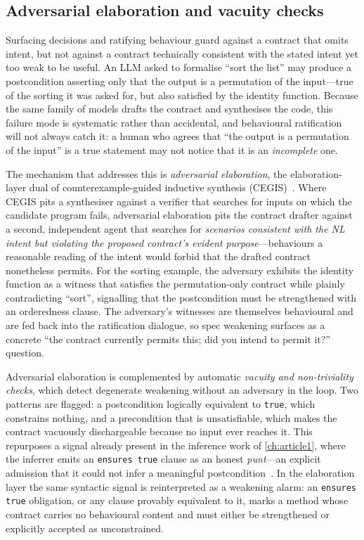 \subsection{Adversarial elaboration and vacuity checks}\label{subsec:a5-adversarial}

Surfacing decisions and ratifying behaviour guard against a contract that omits intent, but not against a contract technically consistent with the stated intent yet too weak to be useful. An LLM asked to formalise ``sort the list'' may produce a postcondition asserting only that the output is a permutation of the input---true of the sorting it was asked for, but also satisfied by the identity function. Because the same family of models drafts the contract and synthesises the code, this failure mode is systematic rather than accidental, and behavioural ratification will not always catch it: a human who agrees that ``the output is a permutation of the input'' is a true statement may not notice that it is an \emph{incomplete} one.

The mechanism that addresses this is \emph{adversarial elaboration}, the elaboration-layer dual of counterexample-guided inductive synthesis (CEGIS)~\cite{solarlezama2008sketching}. Where CEGIS pits a synthesiser against a verifier that searches for inputs on which the candidate program fails, adversarial elaboration pits the contract drafter against a second, independent agent that searches for \emph{scenarios consistent with the NL intent but violating the proposed contract's evident purpose}---behaviours a reasonable reading of the intent would forbid that the drafted contract nonetheless permits. For the sorting example, the adversary exhibits the identity function as a witness that satisfies the permutation-only contract while plainly contradicting ``sort'', signalling that the postcondition must be strengthened with an orderedness clause. The adversary's witnesses are themselves behavioural and are fed back into the ratification dialogue, so spec weakening surfaces as a concrete ``the contract currently permits this; did you intend to permit it?'' question.

Adversarial elaboration is complemented by automatic \emph{vacuity and non-triviality checks}, which detect degenerate weakening without an adversary in the loop. Two patterns are flagged: a postcondition logically equivalent to \lstinline|true|, which constrains nothing, and a precondition that is unsatisfiable, which makes the contract vacuously dischargeable because no input ever reaches it. This repurposes a signal already present in the inference work of \cref{ch:article1}, where the inferrer emits an \lstinline|ensures true| clause as an honest \emph{punt}---an explicit admission that it could not infer a meaningful postcondition~\cite{edmonds_article1}. In the elaboration layer the same syntactic signal is reinterpreted as a weakening alarm: an \lstinline|ensures true| obligation, or any clause provably equivalent to it, marks a method whose contract carries no behavioural content and must either be strengthened or explicitly accepted as unconstrained.

